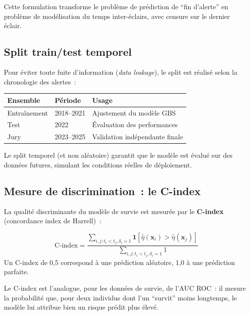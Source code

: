\documentclass[a4paper,11pt]{article}
\newcommand{\ci}{\text{C-index}}
\begin{document}
Cette formulation transforme le problème de prédiction de ``fin d'alerte'' en problème de
modélisation du temps inter-éclairs, avec censure sur le dernier éclair.

\subsection{Split train/test temporel}

Pour éviter toute fuite d'information (\emph{data leakage}), le split est réalisé selon la
chronologie des alertes~:

\begin{center}
\begin{tabular}{lll}
\toprule
\textbf{Ensemble} & \textbf{Période} & \textbf{Usage} \\
\midrule
Entraînement & 2018--2021 & Ajustement du modèle GBS \\
Test & 2022 & Évaluation des performances \\
Jury & 2023--2025 & Validation indépendante finale \\
\bottomrule
\end{tabular}
\end{center}

Le split temporel (et non aléatoire) garantit que le modèle est évalué sur des données futures,
simulant les conditions réelles de déploiement.

\subsection{Mesure de discrimination~: le C-index}

La qualité discriminante du modèle de survie est mesurée par le \textbf{C-index} (concordance
index de Harrell)~:

\begin{tcolorbox}[defstyle, title={C-index de Harrell}]
\begin{equation}
  \ci = \frac{\sum_{i,j : t_i < t_j, \delta_i=1}
    \mathbf{1}\!\left[\hat{\eta}(\mathbf{x}_i) > \hat{\eta}(\mathbf{x}_j)\right]}
    {\sum_{i,j : t_i < t_j, \delta_i=1} 1}
  \label{eq:cindex}
\end{equation}
Un C-index de 0,5 correspond à une prédiction aléatoire, 1,0 à une prédiction parfaite.
\end{tcolorbox}

Le C-index est l'analogue, pour les données de survie, de l'AUC ROC~: il mesure la probabilité
que, pour deux individus dont l'un ``survit'' moins longtemps, le modèle lui attribue bien un
risque prédit plus élevé.
\end{document}
